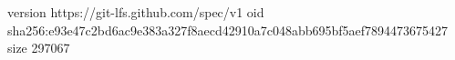 version https://git-lfs.github.com/spec/v1
oid sha256:e93e47c2bd6ac9e383a327f8aecd42910a7c048abb695bf5aef7894473675427
size 297067
